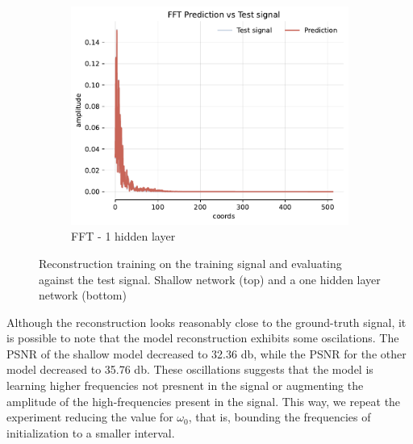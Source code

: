 \begin{figure}[!h]
\begin{subfigure}[b]{0.32\textwidth}
        \centering
        \includegraphics[width=\textwidth]{img/ch3/fft-64hf-1hl-32w-sub3.pdf}
        \caption{FFT - 1 hidden layer}
    \end{subfigure}
    \caption{Reconstruction training on the training signal and evaluating against the test signal. Shallow network (top) and a one hidden layer network (bottom)}
    \label{f:pred-256samples-shallow-deep}
\end{figure}

Although the reconstruction looks reasonably close to the ground-truth signal, it is possible to note that the model reconstruction exhibits some oscilations. The PSNR of the shallow model decreased to 32.36 db, while the PSNR for the other model decreased to 35.76 db. These oscillations suggests that the model is learning higher frequencies not presnent in the signal or augmenting the amplitude of the high-frequencies present in the signal. This way, we repeat the experiment reducing the value for $\omega_0$, that is, bounding the frequencies of initialization to a smaller interval.


